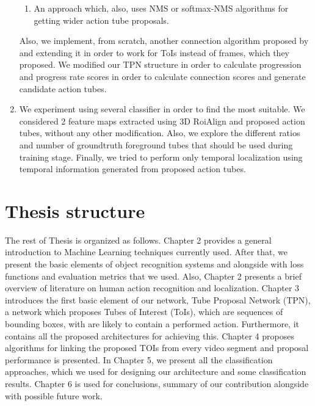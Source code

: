 \begin{enumerate}
\begin{enumerate}
  \item An approach which, also, uses NMS or softmax-NMS algorithms for getting wider action tube proposals.
  \end{enumerate}
  Also, we implement, from scratch, another connection algorithm proposed by \cite{DBLP:journals/corr/abs-1903-00304} and extending it in order to work for ToIs instead of frames, which they proposed.
  We modified our TPN structure in order to calculate progression and progress rate scores in order to calculate connection scores and generate candidate action tubes.
\item We experiment using several classifier in order to find the most suitable. We considered 2 feature maps extracted using 3D RoiAlign and proposed action tubes, without any other
  modification. Also, we explore the different ratios and number of groundtruth foreground tubes that should be used during training
  stage. Finally, we tried to perform only temporal localization using temporal information generated from proposed action tubes.
\end{enumerate}

\section{Thesis structure}
The rest of Thesis is organized as follows. Chapter 2 provides a general introduction to Machine Learning techniques currently used.
After that, we present the basic elements of object recognition systems and alongside with loss functions and evaluation metrics that
we used. Also, Chapter 2 presents a brief overview of literature on human action recognition and localization. Chapter 3 introduces the first basic element of our network, Tube Proposal Network (TPN), a network which proposes Tubes of Interest (ToIs), which are sequences of bounding boxes, with are likely to contain a performed action. Furthermore, it contains all the proposed architectures for achieving this.
Chapter 4 proposes algorithms for linking the proposed TOIs from every video segment and proposal performance is presented.
In Chapter 5, we present all the classification approaches, which we used for designing our architecture and some classification results.
Chapter 6 is used for conclusions, summary of our contribution alongside with possible future work.

% 

